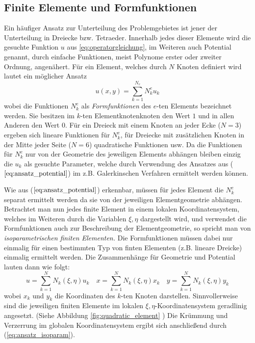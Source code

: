 \subsection{Finite Elemente und Formfunktionen}
\label{sec:finite_elements_and_shape_functions}
Ein häufiger Ansatz zur Unterteilung des Problemgebietes ist jener der Unterteilung in Dreiecke bzw. Tetraeder. Innerhalb jedes dieser Elemente wird die gesuchte Funktion $u$ aus \ref{eq:operatorgleichung}, im Weiteren auch Potential genannt, durch einfache Funktionen, meist Polynome erster oder zweiter Ordnung, angenähert.\newline
Für ein Element, welches durch $N$ Knoten definiert wird lautet ein möglicher Ansatz 
\begin{equation}
\label{eq:ansatz_potential}
u(x,y) = \sum_{k = 1}^{N_e}N_k^e u_k
\end{equation}
wobei die Funktionen $N_k^e$ als \textit{Formfunktionen} des $e$-ten Elements bezeichnet werden. Sie besitzen im $k$-ten Elementknotenknoten den Wert $1$ und in allen Anderen den Wert $0$. \newline
Für ein Dreieck mit einem Knoten an jeder Ecke ($N = 3$) ergeben sich lineare Funktionen für $N_k^e$, für Dreiecke mit zusätzlichen Knoten in der Mitte jeder Seite ($N=6$) quadratische Funktionen usw. \newline
Da die Funktionen für $N_k^e$ nur von der Geometrie des jeweiligen Elements abhängen bleiben einzig die $u_k$ als gesuchte Parameter, welche durch Verwendung des Ansatzes aus ($\ref{eq:ansatz_potential}$) im z.B. Galerkinschen Verfahren ermittelt werden können.\newline

Wie aus ($\ref{eq:ansatz_potential}$) erkennbar, müssen für jedes Element die $N_k^e$ separat ermittelt werden da sie von der jeweiligen Elementgeometrie abhängen. Betrachtet man nun jedes finite Element in einem lokalen Koordinatensystem, welches im Weiteren durch die Variablen $\xi,\eta$ dargestellt wird, und verwendet die Formfunktionen auch zur Beschreibung der Elementgeometrie, so spricht man von \textit{isoparametrischen finiten Elementen.}\newline
Die Formfunktionen müssen dabei nur einmalig für einen bestimmten Typ von finten Elementen (z.B. lineare Dreicke) einmalig ermittelt werden. Die Zusammenhänge für Geometrie und Potential lauten dann wie folgt:
\begin{equation}
\label{eq:ansatz_isoparam}
u = \sum_{k = 1}^{N} N_k(\xi, \eta) u_k \quad x = \sum_{k = 1}^{N} N_k(\xi, \eta) x_k  \quad y = \sum_{k = 1}^{N} N_k(\xi, \eta) y_k
\end{equation}
wobei $x_k$ und $y_k$ die Koordinaten des $k$-ten Knoten darstellen. Sinnvollerweise sind die jeweiligen finiten Elemente im lokalen $\xi,\eta$-Koordinatensystem geradlinig angesetzt. (Siehe Abbildung \ref{fig:quadratic_element} ) Die Krümmung und Verzerrung im globalen Koordinatensystem ergibt sich anschließend durch (\ref{eq:ansatz_isoparam}).



